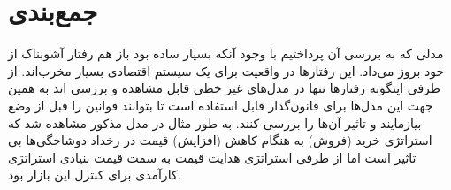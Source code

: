 \documentclass[13pt,onecolumn,a4paper]{article}
\begin{document}
\section{جمع‌بندی}
مدلی که به بررسی آن پرداختیم با وجود آنکه بسیار ساده بود باز هم رفتار آشوبناک از خود بروز می‌داد. این رفتارها در واقعیت برای یک سیستم اقتصادی بسیار مخرب‌اند. از طرفی اینگونه رفتارها تنها در مدل‌های غیر خطی قابل مشاهده و بررسی اند به همین جهت این مدل‌ها برای قانون‌گذار قابل استفاده است تا بتوانند قوانین را قبل از وضع بیازمایند و تاثیر آن‌ها را بررسی کنند. به طور مثال در مدل مذکور مشاهده شد که استراتژی خرید (فروش) به هنگام کاهش (افزایش) قیمت در رخداد دوشاخگی‌ها بی تاثیر است اما از طرفی استراتژی هدایت قیمت به سمت قیمت بنیادی استراتژی کارآمدی برای کنترل این بازار بود.





	
\end{document}

